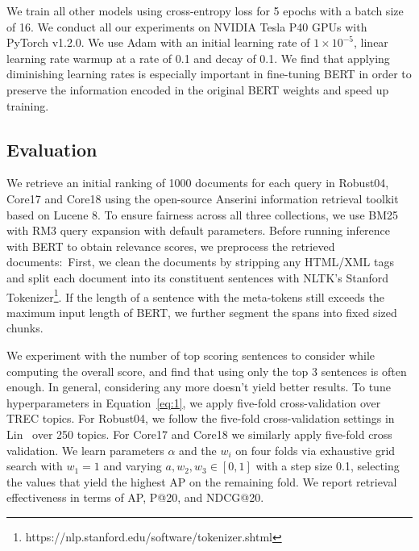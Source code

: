 We train all other models using cross-entropy loss for 5 epochs with a batch size of 16.
We conduct all our experiments on NVIDIA Tesla P40 GPUs with PyTorch v1.2.0.
We use Adam \cite{kingma2014adam} with an initial learning rate of $ 1 \times 10^{-5}$, linear learning rate warmup at a rate of 0.1 and decay of 0.1.
We find that applying diminishing learning rates is especially important in fine-tuning BERT in order to preserve the information encoded in the original BERT weights and speed up training.

\subsection{Evaluation}

We retrieve an initial ranking of 1000 documents for each query in Robust04, Core17 and Core18 using the open-source Anserini information retrieval toolkit based on Lucene 8.
To ensure fairness across all three collections, we use BM25 with RM3 query expansion with default parameters.
Before running inference with BERT to obtain relevance scores, we preprocess the retrieved documents:\
First, we clean the documents by stripping any HTML/XML tags and split each document into its constituent sentences with NLTK's Stanford Tokenizer\footnote{https://nlp.stanford.edu/software/tokenizer.shtml}.
If the length of a sentence with the meta-tokens still exceeds the maximum input length of BERT, we further segment the spans into fixed sized chunks.

We experiment with the number of top scoring sentences to consider while computing the overall score, and find that using only the top 3 sentences is often enough.
In general, considering any more doesn't yield better results.
To tune hyperparameters in Equation~\ref{eq:1}, we apply five-fold cross-validation over TREC topics.
For Robust04, we follow the five-fold cross-validation settings in Lin~\cite{lin2019neural} over 250 topics.
For Core17 and Core18 we similarly apply five-fold cross validation.
We learn parameters $\alpha$ and the $w_i$ on four folds via exhaustive grid search with $ w_1 = 1 $ and varying $ a, w_2, w_3 \in [0, 1] $ with a step size 0.1, selecting the values that yield the highest AP on the remaining fold.
We report retrieval effectiveness in terms of AP, P@20, and NDCG@20.